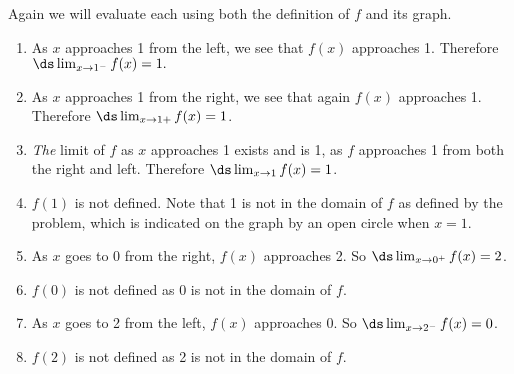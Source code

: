{Again we will evaluate each using both the definition of $f$ and its graph.
\begin{enumerate}
	\item	As $x$ approaches 1 from the left, we see that $f(x)$ approaches 1. Therefore $\ds \lim_{x\to 1^-} f(x)=1.$
	\item	As $x$ approaches 1 from the right, we see that again $f(x)$ approaches 1. Therefore $\ds \lim_{x\to 1+} f(x)=1$.
	\item	\textit{The} limit of $f$ as $x$ approaches 1 exists and is 1, as $f$ approaches 1 from both the right and left. Therefore $\ds \lim_{x\to 1} f(x)=1$.
	\item	$f(1)$ is not defined. Note that 1 is not in the domain of $f$ as defined by the problem, which is indicated on the graph by an open circle when $x=1$.
	\item	As $x$ goes to 0 from the right, $f(x)$ approaches 2. So $\ds \lim_{x\to 0^+} f(x)=2$.
	\item	$f(0)$  is not defined as $0$ is not in the domain of $f$.
	\item	As $x$ goes to 2 from the left, $f(x)$ approaches 0. So $\ds \lim_{x\to 2^-} f(x)=0$.
	\item	$f(2)$  is not defined as 2 is not in the domain of $f$.\eoehere
\end{enumerate}}

